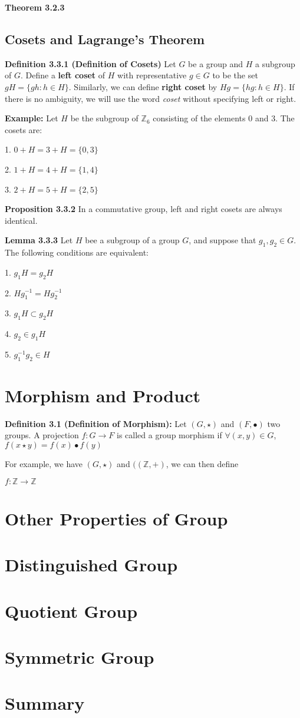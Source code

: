 \documentclass[12pt,openany]{book}
\theoremstyle{definition}
\theoremstyle{definition}
\begin{document}
\noindent\textbf{Theorem 3.2.3}

\section{Cosets and Lagrange's Theorem}

\noindent\textbf{Definition 3.3.1 (Definition of Cosets)} Let $G$ be a group and $H$ a subgroup of $G$. Define a \textbf{left coset} of $H$ with representative $g \in G$ to be the set $gH=\{gh: h \in H\}$. Similarly, we can define \textbf{right coset} by $Hg = \{hg: h\in H\}$. If there is no ambiguity, we will use the word \textit{coset} without specifying left or right.

\noindent\textbf{Example:} Let $H$ be the subgroup of $\mathbb{Z}_6$ consisting of the elements $0$ and $3$. The cosets are:

1. $0+H=3+H=\{0,3\}$

2. $1+H=4+H=\{1,4\}$

3. $2+H=5+H=\{2,5\}$

\noindent\textbf{Proposition 3.3.2} In a commutative group, left and right cosets are always identical.

\noindent\textbf{Lemma 3.3.3} Let $H$ bee a subgroup of a group $G$, and suppose that $g_1,g_2 \in G$. The following conditions are equivalent:

1. $g_1H=g_2H$

2. $Hg_{1}^{-1}=Hg_{2}^{-1}$

3. $g_1H \subset g_2H$

4. $g_2 \in g_1H$

5. $g_1^{-1}g_2 \in H$
\chapter{Morphism and Product}

\noindent\textbf{Definition 3.1 (Definition of Morphism):} Let $(G, \star)$ and $(F, \bullet)$ two groups. A projection $f: G \to F$ is called a group morphism if $\forall (x, y) \in G$, $f(x \star y) = f(x) \bullet f(y)$

For example, we have $(G, \star)$ and $((\mathbb{Z}, +)$, we can then define

$f: \mathbb{Z} \to \mathbb{Z}$


\chapter{Other Properties of Group}

\chapter{Distinguished Group}

\chapter{Quotient Group}

\chapter{Symmetric Group}

\chapter{Summary}
\end{document}
